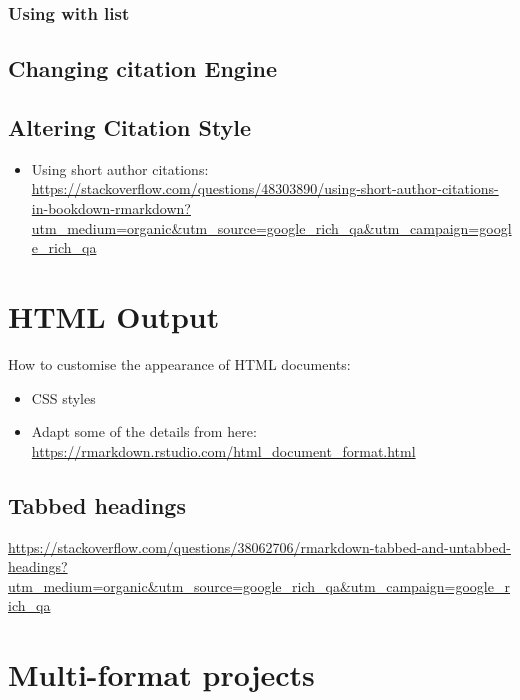 \documentclass[]{book}
\providecommand{\tightlist}{%
  \setlength{\itemsep}{0pt}\setlength{\parskip}{0pt}}
\begin{document}
\subsection{Using with list}\label{using-with-list}

\section{Changing citation Engine}\label{changing-citation-engine}

\section{Altering Citation Style}\label{altering-citation-style}

\begin{itemize}
\tightlist
\item
  Using short author citations:
  \url{https://stackoverflow.com/questions/48303890/using-short-author-citations-in-bookdown-rmarkdown?utm_medium=organic\&utm_source=google_rich_qa\&utm_campaign=google_rich_qa}
\end{itemize}

\chapter{HTML Output}\label{html-output}

How to customise the appearance of HTML documents:

\begin{itemize}
\tightlist
\item
  CSS styles
\item
  Adapt some of the details from here:
  \url{https://rmarkdown.rstudio.com/html_document_format.html}
\end{itemize}

\section{Tabbed headings}\label{tabbed-headings}

\url{https://stackoverflow.com/questions/38062706/rmarkdown-tabbed-and-untabbed-headings?utm_medium=organic\&utm_source=google_rich_qa\&utm_campaign=google_rich_qa}

\chapter{Multi-format projects}\label{multi-format-projects}
\end{document}
